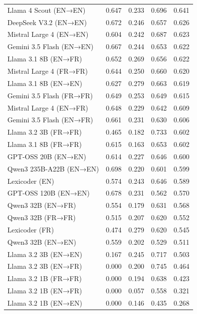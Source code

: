 \documentclass[
  man,
  floatsintext,
  longtable,
  nolmodern,
  notxfonts,
  notimes,
  mask,
  colorlinks=true,linkcolor=blue,citecolor=blue,urlcolor=blue]{apa7}
\begin{document}
\begin{table}
\begin{longtable}[]{@{}lllll@{}}
Llama 4 Scout (EN→EN) & 0.647 & 0.233 & 0.696 & 0.641 \\
DeepSeek V3.2 (EN→EN) & 0.672 & 0.246 & 0.657 & 0.626 \\
Mistral Large 4 (EN→EN) & 0.604 & 0.242 & 0.687 & 0.623 \\
Gemini 3.5 Flash (EN→EN) & 0.667 & 0.244 & 0.653 & 0.622 \\
Llama 3.1 8B (EN→FR) & 0.652 & 0.269 & 0.656 & 0.622 \\
Mistral Large 4 (FR→FR) & 0.644 & 0.250 & 0.660 & 0.620 \\
Llama 3.1 8B (EN→EN) & 0.627 & 0.279 & 0.663 & 0.619 \\
Gemini 3.5 Flash (FR→FR) & 0.649 & 0.253 & 0.649 & 0.615 \\
Mistral Large 4 (EN→FR) & 0.648 & 0.229 & 0.642 & 0.609 \\
Gemini 3.5 Flash (EN→FR) & 0.661 & 0.231 & 0.630 & 0.606 \\
Llama 3.2 3B (FR→FR) & 0.465 & 0.182 & 0.733 & 0.602 \\
Llama 3.1 8B (FR→FR) & 0.615 & 0.163 & 0.653 & 0.602 \\
GPT-OSS 20B (EN→EN) & 0.614 & 0.227 & 0.646 & 0.600 \\
Qwen3 235B-A22B (EN→EN) & 0.698 & 0.220 & 0.601 & 0.599 \\
Lexicoder (EN) & 0.574 & 0.243 & 0.646 & 0.589 \\
GPT-OSS 120B (EN→EN) & 0.678 & 0.231 & 0.562 & 0.570 \\
Qwen3 32B (EN→FR) & 0.554 & 0.179 & 0.631 & 0.568 \\
Qwen3 32B (FR→FR) & 0.515 & 0.207 & 0.620 & 0.552 \\
Lexicoder (FR) & 0.474 & 0.279 & 0.620 & 0.545 \\
Qwen3 32B (EN→EN) & 0.559 & 0.202 & 0.529 & 0.511 \\
Llama 3.2 3B (EN→EN) & 0.167 & 0.245 & 0.717 & 0.503 \\
Llama 3.2 3B (EN→FR) & 0.000 & 0.200 & 0.745 & 0.464 \\
Llama 3.2 1B (FR→FR) & 0.000 & 0.194 & 0.638 & 0.423 \\
Llama 3.2 1B (EN→FR) & 0.000 & 0.057 & 0.558 & 0.321 \\
Llama 3.2 1B (EN→EN) & 0.000 & 0.146 & 0.435 & 0.268 \\
\end{longtable}

\end{table}

\clearpage
\begin{landscape}
\begin{table}[h]
\caption{F1 Scores for 7-Category Classification}
\begin{center}
\scriptsize
\setlength{\tabcolsep}{5pt}
\renewcommand{\arraystretch}{0.95}

\end{center}
\end{table}
\end{landscape}
\clearpage
\end{document}
